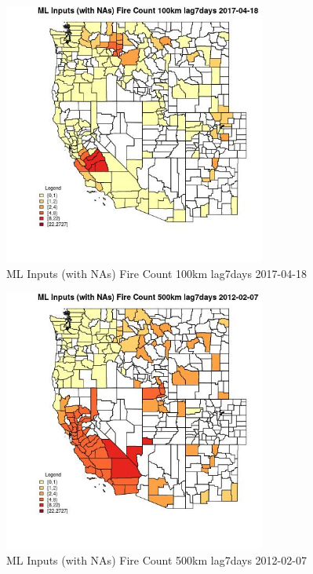 \begin{figure} 
\centering  
\includegraphics[width=0.77\textwidth]{Code_Outputs/Report_ML_input_PM25_Step4_part_f_de_duplicated_aves_prioritize_24hr_obswNAs_CountyFire_Count_100km_lag7daysMean2017-04-18.jpg} 
\caption{\label{fig:Report_ML_input_PM25_Step4_part_f_de_duplicated_aves_prioritize_24hr_obswNAsCountyFire_Count_100km_lag7daysMean2017-04-18}ML Inputs (with NAs) Fire Count 100km lag7days 2017-04-18} 
\end{figure} 
 

\begin{figure} 
\centering  
\includegraphics[width=0.77\textwidth]{Code_Outputs/Report_ML_input_PM25_Step4_part_f_de_duplicated_aves_prioritize_24hr_obswNAs_CountyFire_Count_500km_lag7daysMean2012-02-07.jpg} 
\caption{\label{fig:Report_ML_input_PM25_Step4_part_f_de_duplicated_aves_prioritize_24hr_obswNAsCountyFire_Count_500km_lag7daysMean2012-02-07}ML Inputs (with NAs) Fire Count 500km lag7days 2012-02-07} 
\end{figure} 
 

